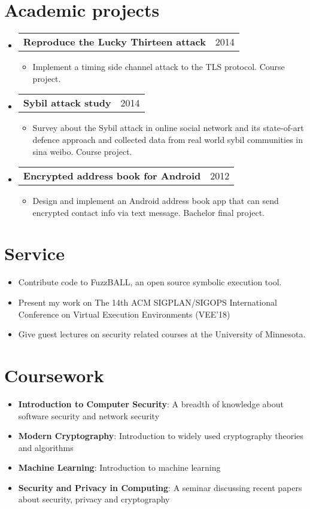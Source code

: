 \documentclass[letterpaper,11pt]{article}
\makeatletter
\newcommand{\brief}[2]{
  \item[]\small{
    \textbf{#1}{: #2 \vspace{-2pt}}
  }
}
\newcommand{\myitem}[1]{
  \item[-]\small{
    { #1 \vspace{-2pt}}
  }
}
\newcommand{\project}[3]{
  \vspace{-1pt}\item[]
  \begin{tabular*}{0.97\textwidth}{l@{\extracolsep{\fill}}r}
  \textbf{\small#1} & {\small#2}\\
  \end{tabular*}
      {\small#3}\vspace{-5pt}
}
\newcommand{\content}{\begin{itemize}[leftmargin=0px]}
\newcommand{\contentend}{\end{itemize}}
\newcommand{\mylist}{\begin{itemize}[leftmargin=25px,rightmargin=25px]}
\newcommand{\mylistend}{\end{itemize}\vspace{-5pt}}
\makeatother
\begin{document}
\section{Academic projects}
	\content  
    \project
    {Reproduce the Lucky Thirteen attack}{2014}{}
    \mylist
      \myitem{
        Implement a timing side channel attack \cite{AlFardan2013} to the TLS protocol. 
        Course project.}
    \mylistend
    \project
      {Sybil attack study}{2014}{}
      \mylist
        \myitem{
          Survey about the Sybil attack in online social network and its state-of-art defence approach      
          and collected data from real world sybil communities in sina weibo. 
          Course project.}
      \mylistend
  \project
    {Encrypted address book for Android}{2012}{}
    \mylist
      \myitem{
        Design and implement an Android address book app that can send encrypted contact info via text message. 
        Bachelor final project.}
      \mylistend   
  \contentend     
\section{Service}
\mylist
\myitem{Contribute code to FuzzBALL, an open source symbolic execution tool.}
\myitem{Present my work on The 14th ACM SIGPLAN/SIGOPS International Conference on Virtual Execution Environments (VEE'18)}
\myitem{Give guest lectures on security related courses at the University of Minnesota.}
\mylistend

%
\section{Coursework}
  \content
    \brief
      {Introduction to Computer Security}
      {A breadth of knowledge about software security and network security}   
    \brief
      {Modern Cryptography}
      {Introduction to widely used cryptography theories and algorithms}
    \brief
      {Machine Learning}
      {Introduction to machine learning}      
    \brief
      {Security and Privacy in Computing}
      {A seminar discussing recent papers about security, privacy and cryptography}
  \contentend  



\end{document}
